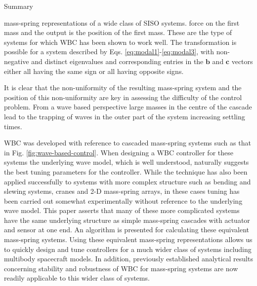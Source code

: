 \documentclass{beamer}
\begin{document}
\begin{frame}{Summary}

mass-spring representations of a wide class of SISO systems.
force on the first mass and the output is the position of the first mass.
These are the type of systems for which WBC has been shown to work well.
The transformation is possible for a system described by Eqs. \ref{eq:modal1}-\ref{eq:modal3}, with non-negative and distinct eigenvalues and corresponding entries in the $\mathbf{b}$ and $\mathbf{c}$ vectors either all having the same sign or all having opposite signs.

It is clear that the non-uniformity of the resulting mass-spring system and the position of this non-uniformity are key in assessing the difficulty of the control problem.
From a wave based perspective large masses in the centre of the cascade lead to the trapping of waves in the outer part of the system increasing settling times.



WBC was developed with reference to cascaded mass-spring systems such as that in Fig. \ref{fig:wave-based-control}.
When designing a WBC controller for these systems the underlying wave model, which is well understood, naturally suggests the best tuning parameters for the controller.
While the technique has also been applied successfully to systems with more complex structure such as bending and slewing systems, cranes and 2-D mass-spring arrays, in these cases tuning has been carried out somewhat experimentally without reference to the underlying wave model.
This paper asserts that many of these more complicated systems have the same underlying structure as simple mass-spring cascades with actuator and sensor at one end.
An algorithm is presented for calculating these equivalent mass-spring systems.
Using these equivalent mass-spring representations allows us to quickly design and tune controllers for a much wider class of systems including multibody spacecraft models.
In addition, previously established analytical results concerning stability and robustness of WBC for mass-spring systems are now readily applicable to this wider class of systems.


\end{frame}
\end{document}
